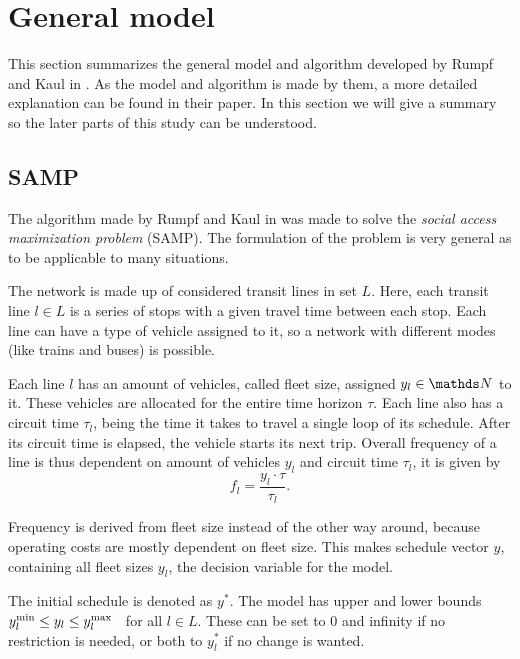 \chapter{General model}\label{sec:generalmodel}
This section summarizes the general model and algorithm developed by Rumpf and Kaul in \cite{rumpf}. As the model and algorithm is made by them, a more detailed explanation can be found in their paper. In this section we will give a summary so the later parts of this study can be understood.
\section{SAMP}
The algorithm made by Rumpf and Kaul in \cite{rumpf} was made to solve the \emph{social access maximization problem} (SAMP). The formulation of the problem is very general as to be applicable to many situations.

The network is made up of considered transit lines in set $L$. Here, each transit line $l\in L$ is a series of stops with a given travel time between each stop. Each line can have a type of vehicle assigned to it, so a network with different modes (like trains and buses) is possible.

Each line $l$ has an amount of vehicles, called fleet size, assigned $y_l \in \N$ to it. These vehicles are allocated for the entire time horizon $\tau$. Each line also has a circuit time $\tau_l$, being the time it takes to travel a single loop of its schedule. After its circuit time is elapsed, the vehicle starts its next trip. Overall frequency of a line is thus dependent on amount of vehicles $y_l$ and circuit time $\tau_l$, it is given by
\begin{equation*}
    f_l = \frac{y_l \cdot \tau}{\tau_l}.
\end{equation*}

Frequency is derived from fleet size instead of the other way around, because operating costs are mostly dependent on fleet size. This makes schedule vector $y$, containing all fleet sizes $y_l$, the decision variable for the model.

The initial schedule is denoted as $y^*$. The model has upper and lower bounds $y_l^{\text{min}} \leq y_l \leq y_l^{\text{max}} \hspace{2mm}$ for all $l\in L$. These can be set to 0 and infinity if no restriction is needed, or both to $y^*_l$ if no change is wanted.

